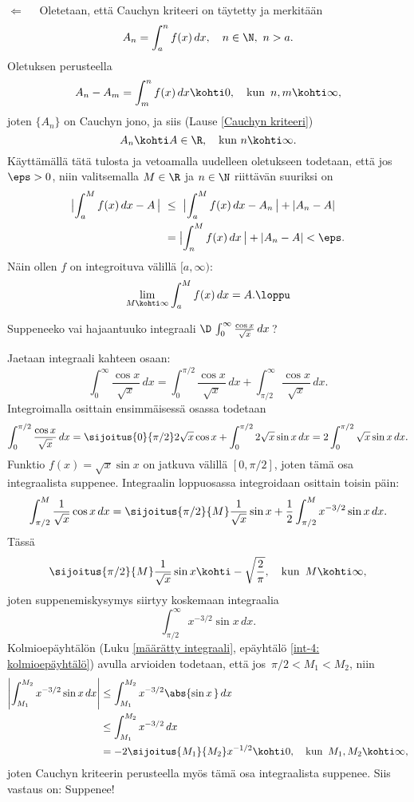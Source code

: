 $\boxed{\Leftarrow}\quad$ Oletetaan, että Cauchyn kriteeri on täytetty ja merkitään
\[
A_n=\int_a^n f(x)\, dx,\quad n\in\N, \ n>a.
\]
Oletuksen perusteella
\[
A_n-A_m=\int_m^n f(x) \, dx\kohti 0, \quad \text{kun}\,\ n,m\kohti\infty,
\]
joten $\{A_n\}$ on Cauchyn jono, ja siis (Lause \ref{Cauchyn kriteeri})
\[
A_n\kohti A\in\R, \quad \text{kun}\ n\kohti\infty.
\]
Käyttämällä tätä tulosta ja vetoamalla uudelleen oletukseen todetaan, että jos $\eps>0$, niin
valitsemalla $M\in\R$ ja $n\in\N$ riittävän suuriksi on
\begin{align*}
\bigl|\int_a^M f(x)\, dx-A\,\bigr|\ &\le\ \bigl|\int_a^M f(x)\,dx-A_n\,\bigr|+|A_n-A| \\
                                    &= \bigl|\int_n^M f(x)\,dx\,\bigr|+|A_n-A|<\eps.
\end{align*}
Näin ollen $f$ on integroituva välillä $[a,\infty)$:
\[
\lim_{M\kohti\infty}\int_a^M f(x)\,dx = A. \loppu
\]
\begin{Exa}
Suppeneeko vai hajaantuuko integraali $\D\,\int_0^\infty \frac{\cos x}{\sqrt{x}}\,dx$\,?
\end{Exa}
\ratk Jaetaan integraali kahteen osaan:
\[
\int_0^\infty \frac{\cos x}{\sqrt{x}}\,dx = \int_0^{\pi/2} \frac{\cos x}{\sqrt{x}}\,dx
                                          + \int_{\pi/2}^\infty \frac{\cos x}{\sqrt{x}}\,dx.
\]
Integroimalla osittain ensimmäisessä osassa todetaan
\[
\int_0^{\pi/2} \frac{\cos x}{\sqrt{x}}\,dx  
            = \sijoitus{0}{\pi/2} 2\sqrt{x}\cos x + \int_0^{\pi/2} 2\sqrt{x}\sin x\,dx
            = 2 \int_0^{\pi/2} \sqrt{x}\sin x\,dx.
\]
Funktio $f(x)=\sqrt{x}\sin x$ on jatkuva välillä $[0,\pi/2]$, joten tämä osa integraalista
suppenee. Integraalin loppuosassa integroidaan osittain toisin päin:
\[
\int_{\pi/2}^M \frac{1}{\sqrt{x}}\cos x \, dx 
                   = \sijoitus{\pi/2}{M}\frac{1}{\sqrt{x}}\sin x
                            +\frac{1}{2}\int_{\pi/2}^M x^{-3/2}\sin x\,dx.
\]
Tässä
\[
\sijoitus{\pi/2}{M}\frac{1}{\sqrt{x}}\sin x \kohti -\sqrt{\frac{2}{\pi}}, \quad
                                                        \text{kun}\,\ M\kohti\infty,
\]
joten suppenemiskysymys siirtyy koskemaan integraalia
\[
\int_{\pi/2}^\infty x^{-3/2}\sin x \, dx.
\]
Kolmioepäyhtälön (Luku \ref{määrätty integraali}, epäyhtälö \eqref{int-4: kolmioepäyhtälö})
avulla arvioiden todetaan, että jos $\,\pi/2<M_1<M_2$, niin
\begin{align*}
\left|\int_{M_1}^{M_2} x^{-3/2}\sin x\,dx\right| 
           &\le \int_{M_1}^{M_2} x^{-3/2}\abs{\sin x\,}\,dx \\
           &\le \int_{M_1}^{M_2} x^{-3/2} \, dx \\
           &= -2\sijoitus{M_1}{M_2} x^{-1/2}\kohti 0, \quad \text{kun}\,\ M_1,M_2\kohti\infty,
\end{align*}
joten Cauchyn kriteerin perusteella myös tämä osa integraalista suppenee. Siis vastaus on:
Suppenee! \loppu

